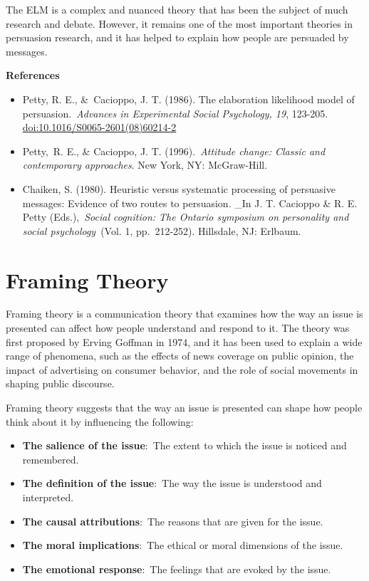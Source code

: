 \documentclass[
]{book}
\begin{document}
The ELM is a complex and nuanced theory that has been the subject of much research and debate. However, it remains one of the most important theories in persuasion research, and it has helped to explain how people are persuaded by messages.

\textbf{References}

\begin{itemize}
\item
  Petty, R. E., \&~Cacioppo, J. T. (1986). The elaboration likelihood model of persuasion.~\emph{Advances in Experimental Social Psychology, 19}, 123-205. \url{doi:10.1016/S0065-2601(08)60214-2}
\item
  Petty,~R. E., \& Cacioppo, J. T. (1996).~\emph{Attitude change: Classic and contemporary approaches}. New York, NY: McGraw-Hill.
\item
  Chaiken, S. (1980). Heuristic versus systematic processing of persuasive messages: Evidence of two routes to persuasion. \_In J. T. Cacioppo \& R. E. Petty (Eds.),~\emph{Social cognition: The Ontario symposium on personality and social psychology}~(Vol. 1, pp.~212-252). Hillsdale, NJ: Erlbaum.
\end{itemize}

\section{Framing Theory}\label{framing-theory}

Framing theory is a communication theory that examines how the way an issue is presented can affect how people understand and respond to it. The theory was first proposed by Erving Goffman in 1974, and it has been used to explain a wide range of phenomena, such as the effects of news coverage on public opinion, the impact of advertising on consumer behavior, and the role of social movements in shaping public discourse.

Framing theory suggests that the way an issue is presented can shape how people think about it by influencing the following:

\begin{itemize}
\item
  \textbf{The salience of the issue}:~The extent to which the issue is noticed and remembered.
\item
  \textbf{The definition of the issue}:~The way the issue is understood and interpreted.
\item
  \textbf{The causal attributions}:~The reasons that are given for the issue.
\item
  \textbf{The moral implications}:~The ethical or moral dimensions of the issue.
\item
  \textbf{The emotional response}:~The feelings that are evoked by the issue.
\end{itemize}
\end{document}
